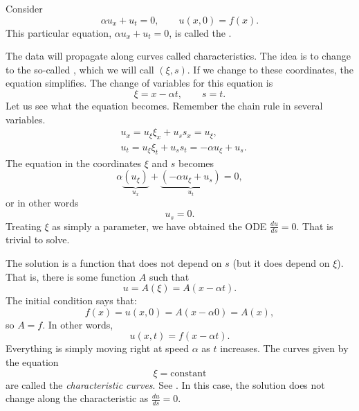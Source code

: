 \begin{example}
Consider
\begin{equation*}
\alpha u_x + u_t = 0, \qquad u(x,0) = f(x) .
\end{equation*}
This particular equation, $\alpha u_x + u_t = 0$, is
called the \emph{}.

The data will propagate along curves called characteristics.  The
idea is to change to the
so-called \emph{}, which we will call
$(\xi,s)$.
If we change to these coordinates, the equation simplifies.  The change of variables for this
equation is
\begin{equation*}
\xi = x - \alpha t ,  \qquad s = t .
\end{equation*}
Let us see what the equation becomes. Remember the chain rule in several
variables.
\begin{align*}
& u_x = u_\xi \xi_x + u_s s_x = u_\xi , \\
& u_t = u_\xi \xi_t + u_s s_t = - \alpha u_\xi + u_s .
\end{align*}
The equation in the coordinates $\xi$ and $s$ becomes
\begin{equation*}
\alpha
\underbrace{(u_\xi)}_{u_x}
+
\underbrace{(- \alpha u_\xi + u_s)}_{u_t}
= 0 ,
\end{equation*}
or in other words
\begin{equation*}
u_s = 0 .
\end{equation*}
Treating $\xi$ as simply a parameter, we have
obtained the ODE $\frac{d u}{d s} = 0$.
That is trivial to solve.

The solution is a function that does
not depend on $s$ (but it does depend on $\xi$).
That is, there is some function $A$ such that
\begin{equation*}
u = A(\xi) = A(x - \alpha t) .
\end{equation*}
The initial condition says that:
\begin{equation*}
f(x) = u(x,0) = A(x - \alpha 0) = A(x) ,
\end{equation*}
so $A=f$.  In other words,
\begin{equation*}
u(x,t) = f(x-\alpha t) .
\end{equation*}
Everything is simply moving right at speed $\alpha$ as $t$ increases.
The curves given by the equation
\begin{equation*}
\xi = \text{constant}
\end{equation*}
are called the \emph{characteristic curves}.
See .
In this case, the solution does not change
along the characteristic as $\frac{du}{ds} = 0$.


\end{example}

